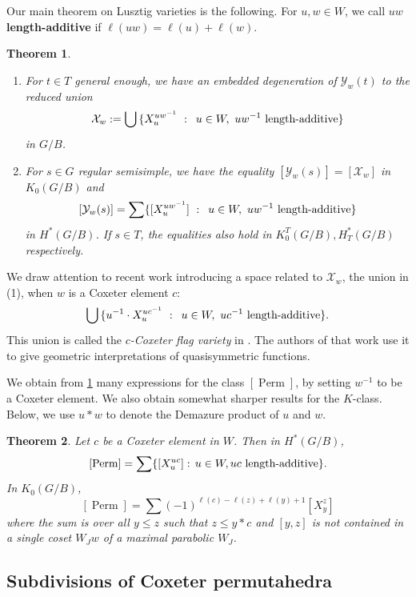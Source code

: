 \documentclass[11pt]{amsart}
\newtheorem{mainthm}{Theorem}
\theoremstyle{definition}
\DeclareMathOperator{\Perm}{Perm}
\newcommand\defn[1]{{\bf #1}}
\def\calX{\mathcal{X}}
\newcommand\calY{{\mathcal Y}}
\renewcommand{\colon}{\mathrel{:}}
\renewcommand{\colon}{:\mkern\thinmuskip}
\begin{document}
Our main theorem on Lusztig varieties is the following. For $u,w \in W$, we call $uw$ \defn{length-additive} if $\ell(uw)= \ell(u) + \ell(w)$.


\begin{mainthm}\label{mainthm: Degeneration of Lusztig Varieties}
	\begin{enumerate}
		\item For $t \in T$ general enough, we have an embedded degeneration of
$\calY_w(t)$ to the reduced union 
\[\calX_w:=\bigcup\, \{  X_{u}^{uw^{-1}} \ \colon\
u \in W, \  uw^{-1} ~\text{length-additive} \}     \]
in $G/B$.

\item  For $s \in G$ regular semisimple, we have the equality $[\calY_w(s)] = [\calX_w]$ in $K_0(G/B)$ and
\[[\calY_w(s)] = \sum\{[X_{u}^{uw^{-1}}] \ \colon\
u \in W, \  uw^{-1} ~\text{length-additive} \}\]
in $H^*(G/B)$. If $s\in T$, the equalities also hold in $K^T_0(G/B),H^*_T(G/B)$
respectively. 
\end{enumerate}
\end{mainthm}

We draw attention to recent work \cite{bergeron2026coxeterflagvariety}
introducing a space related to $\calX_w$, the union in (1), when $w$ is a Coxeter element $c$:
\[\bigcup\, \{  u^{-1} \cdot X_{u}^{uc^{-1}} \ \colon\
u \in W, \  uc^{-1} ~\text{length-additive} \}.     \]
This union is called the {\em $c$-Coxeter
	flag variety} in \cite{bergeron2026coxeterflagvariety}. The authors of that work use it to give geometric interpretations of
quasisymmetric functions.

We obtain from \cref{mainthm: Degeneration of Lusztig Varieties} many expressions for the class $[\Perm]$, by setting $w^{-1}$ to be a Coxeter element. We also obtain somewhat sharper results for the $K$-class. Below, we use $u* w$ to denote the Demazure product of $u$ and $w$. 

\begin{mainthm}\label{mainthm:permutahedral-class}
   	    Let $c$ be a Coxeter element in $W$. Then in $H^*(G/B)$, 
   \[ [\Perm] = \sum \{ [X_{u}^{uc}] \colon u\in W, uc\text{ length-additive} \}. \]
   In $K_0(G/B)$, 
   \[[\Perm] = \sum (-1)^{\ell(c)-\ell(z) + \ell(y)+1} [X_y^z]\]
   where the sum is over all $y \leq z$ such that $z \leq y *c$ and $[y,z]$ is not contained in a single coset $W_Jw$ of a maximal parabolic $W_J$. 
\end{mainthm}

\subsection{Subdivisions of Coxeter permutahedra}
\end{document}

